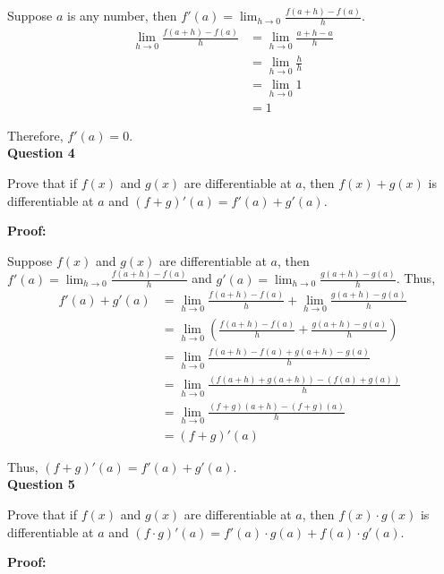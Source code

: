 \documentclass[a4paper,12pt]{report}
\begin{document}
\noindent
Suppose $a$ is any number, then $f'(a)=\displaystyle{\lim_{h\to 0}}\frac{f(a+h)-f(a)}{h}$.
\begin{align*}
\displaystyle{\lim_{h\to 0}}\frac{f(a+h)-f(a)}{h}
 & = \displaystyle{\lim_{h\to 0}\frac{a+h-a}{h}}\\
 & = \displaystyle{\lim_{h\to 0}\frac{h}{h}}\\
 & = \displaystyle{\lim_{h\to 0}1}\\
 & = 1
\end{align*}

\noindent
Therefore, $f'(a) = 0$.\\

\noindent
\textbf{Question 4}

\noindent
Prove that if $f(x)$ and $g(x)$ are differentiable at $a$, then $f(x)+g(x)$ is differentiable at $a$ and $(f+g)'(a) = f'(a)+g'(a)$. 

\noindent
\textbf{Proof: }

\noindent
Suppose $f(x)$ and $g(x)$ are differentiable at $a$, then $f'(a)=\displaystyle{\lim_{h\to 0}}\frac{f(a+h)-f(a)}{h}$ and $g'(a)=\displaystyle{\lim_{h\to 0}}\frac{g(a+h)-g(a)}{h}$. Thus, 
\begin{align*}
f'(a) +g'(a) &= \displaystyle{\lim_{h\to 0}}\frac{f(a+h)-f(a)}{h} + \displaystyle{\lim_{h\to 0}}\frac{g(a+h)-g(a)}{h}\\
&= \displaystyle{\lim_{h\to 0}}(\frac{f(a+h)-f(a)}{h} +\frac{g(a+h)-g(a)}{h})\\
&= \displaystyle{\lim_{h\to 0}}\frac{f(a+h)-f(a) + g(a+h)-g(a)}{h}\\
&= \displaystyle{\lim_{h\to 0}}\frac{(f(a+h)+ g(a+h))-(f(a)+g(a))}{h}\\
&= \displaystyle{\lim_{h\to 0}}\frac{(f+g)(a+h)-(f+g)(a)}{h}\\
&= (f+g)'(a)
\end{align*}

\noindent
Thus, $(f+g)'(a)=f'(a)+g'(a)$.\\

\noindent
\textbf{Question 5}

\noindent
Prove that if $f(x)$ and $g(x)$ are differentiable at $a$, then $f(x)\cdot{g(x)}$ is differentiable at $a$ and $(f\cdot{g})'(a) = f'(a)\cdot{g(a)}+f(a)\cdot{g'(a)}$. 

\noindent
\textbf{Proof:}
\end{document}
